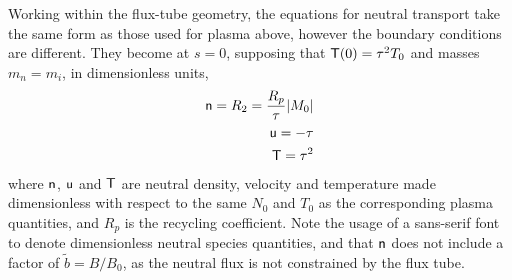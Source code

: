 Working within the flux-tube geometry, the equations for neutral transport
take the same form as those used for plasma above,
however the boundary conditions are different.
They become at $s=0$, supposing that ${\sf T}(0)=\tau^2 T_0$ and masses~$m_n=m_i$, in dimensionless units,
\begin{eqnarray}
\label{eq:bcnn} {\sf n}=R_2=\frac{R_p}{\tau}|M_0| \\
\label{eq:bcnu} {\sf u}=-\tau \\
\label{eq:bcnt} {\sf T}=\tau^2 
\end{eqnarray}
where ${\sf n}$, ${\sf u}$ and ${\sf T}$ are neutral density, velocity and temperature made
dimensionless with respect to the same $N_0$ and $T_0$ as the corresponding plasma quantities,
and $R_p$ is the recycling coefficient. Note the usage of a sans-serif font to denote
dimensionless neutral species quantities, and that ${\sf n}$ does not include a factor of
$\tilde{b}=B/B_0$, as the neutral flux is not constrained by the flux tube.


